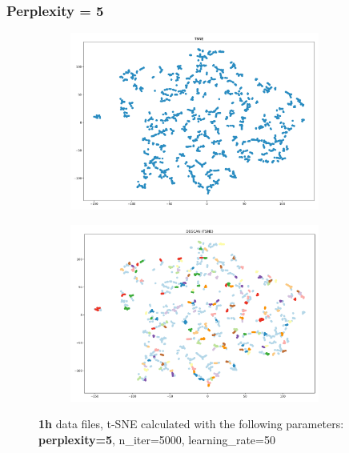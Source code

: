 
\subsubsection{Perplexity = 5}
\begin{figure}[H]
  \centering
  \begin{subfigure}{.5\textwidth}
    \centering
    \includegraphics[width=0.9\textwidth]{./images/tsneParametersTest/perplexity/perp5-1hTSNE.png}
  \end{subfigure}%
  \begin{subfigure}{.5\textwidth}
    \centering
    \includegraphics[width=0.9\textwidth]{./images/tsneParametersTest/perplexity/perp5-1hDBSCAN.png}
  \end{subfigure}
	\caption{\textbf{1h} data files, t-SNE calculated with the following parameters: \textbf{perplexity=5}, n\_iter=5000, learning\_rate=50}
	\label{figure:1hperp5TSNE}
\end{figure}


